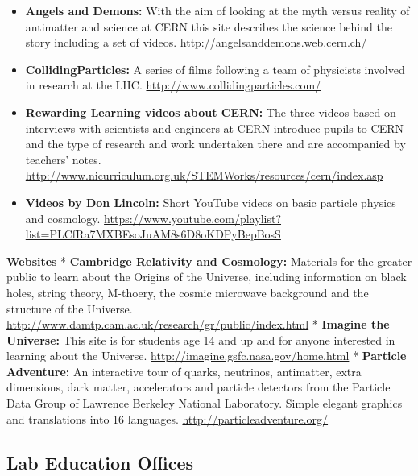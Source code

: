 \begin{itemize}
\tightlist
\item
  \textbf{Angels and Demons:} With the aim of looking at the myth versus
  reality of antimatter and science at CERN this site describes the
  science behind the story including a set of videos.
  \url{http://angelsanddemons.web.cern.ch/}
\item
  \textbf{CollidingParticles:} A series of films following a team of
  physicists involved in research at the LHC.
  \url{http://www.collidingparticles.com/}
\item
  \textbf{Rewarding Learning videos about CERN:} The three videos based
  on interviews with scientists and engineers at CERN introduce pupils
  to CERN and the type of research and work undertaken there and are
  accompanied by teachers' notes.
  \url{http://www.nicurriculum.org.uk/STEMWorks/resources/cern/index.asp}
\item
  \textbf{Videos by Don Lincoln:} Short YouTube videos on basic particle
  physics and cosmology.
  \url{https://www.youtube.com/playlist?list=PLCfRa7MXBEsoJuAM8s6D8oKDPyBepBosS}
\end{itemize}

\textbf{Websites} * \textbf{Cambridge Relativity and Cosmology:}
Materials for the greater public to learn about the Origins of the
Universe, including information on black holes, string theory, M-thoery,
the cosmic microwave background and the structure of the Universe.
\url{http://www.damtp.cam.ac.uk/research/gr/public/index.html} *
\textbf{Imagine the Universe:} This site is for students age 14 and up
and for anyone interested in learning about the Universe.
\url{http://imagine.gsfc.nasa.gov/home.html} * \textbf{Particle
Adventure:} An interactive tour of quarks, neutrinos, antimatter, extra
dimensions, dark matter, accelerators and particle detectors from the
Particle Data Group of Lawrence Berkeley National Laboratory. Simple
elegant graphics and translations into 16 languages.
\url{http://particleadventure.org/}

\subsection{Lab Education Offices}\label{databases:subsec:labeducationoffices}

